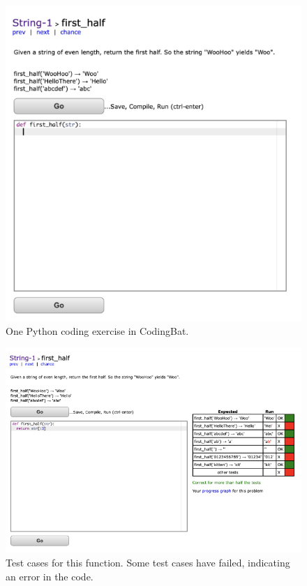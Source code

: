 \documentclass[10pt,twocolumn]{article}
\begin{document}
\begin{figure}
    \centering
    \includegraphics[width=.95\linewidth]{CodingBat1.png}
    \caption{
        One Python coding exercise in CodingBat.
    }
    \label{fig:first-page}
\end{figure}

\begin{figure}
    \centering
    \includegraphics[width=.95\linewidth]{CodingBat2.png}
    \caption{
        Test cases for this function. Some test cases have failed, indicating an error in the code.
    }
    \label{fig:first-page}
\end{figure}
\end{document}

